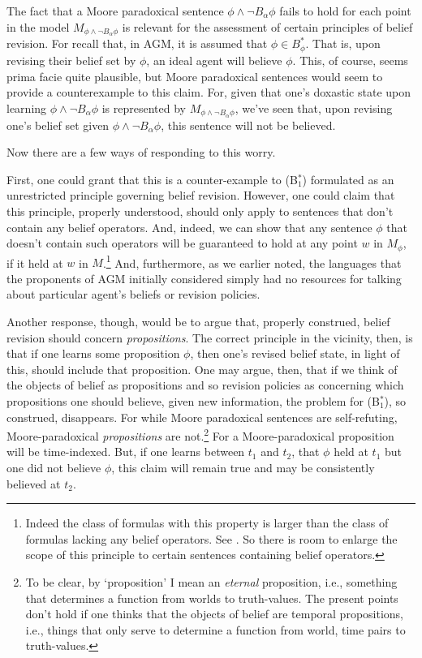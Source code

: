 The fact that a Moore paradoxical sentence $\phi \wedge \lnot B_\alpha \phi$ fails to hold for each point in the model $M_{\phi \wedge \lnot B_\alpha \phi}$ is relevant for the assessment of certain principles of belief revision.
For recall that, in AGM, it is assumed that $\phi \in B^*_\phi$.
That is, upon revising their belief set by $\phi$, an ideal agent will believe $\phi$.
This, of course, seems prima facie quite plausible, but Moore paradoxical sentences would seem to provide a counterexample to this claim.
For, given that one's doxastic state upon learning $\phi \wedge \lnot B_\alpha \phi$ is represented by $M_{\phi \wedge \lnot B_\alpha \phi}$, we've seen that, upon revising one's belief set given $\phi \wedge \lnot B_\alpha \phi$, this sentence will not be believed.


Now there are a few ways of responding to this worry.

First, one could grant that this is a counter-example to (B$^*_1$) formulated as an unrestricted principle governing belief revision.
However, one could claim that this principle, properly understood, should only apply to sentences that don't contain any belief operators.
And, indeed, we can show that any sentence $\phi$ that doesn't contain such operators will be guaranteed to hold at any point $w$ in $M_\phi$, if it held at $w$ in $M$.\footnote{Indeed the class of formulas with this property is larger than the class of formulas lacking any belief operators. See \citet{HollidayIcard1}. So there is room to  enlarge the scope of this principle to certain sentences containing belief operators.}
And, furthermore, as we earlier noted, the languages that the proponents of AGM initially considered simply had no resources for talking about particular agent's beliefs or revision policies.


Another response, though, would be to argue that, properly construed, belief revision should concern \textit{propositions}.
The correct principle in the vicinity, then, is that if one learns some proposition $\phi$, then one's revised belief state, in light of this, should include that proposition.
One may argue, then, that if we think of the objects of belief as propositions and so revision policies as concerning which propositions one should believe, given new information, the problem for (B$^*_1$), so construed, disappears.
For while Moore paradoxical sentences are self-refuting, Moore-paradoxical \textit{propositions} are not.\footnote{To be clear, by `proposition' I mean an \textit{eternal} proposition, i.e., something that determines a function from worlds to truth-values. The present points don't hold if one thinks that the objects of belief are temporal propositions, i.e., things that only serve to determine a function from world, time pairs to truth-values.}
For a Moore-paradoxical proposition will be time-indexed. 
But, if one learns between $t_1$ and $t_2$, that $\phi$ held at $t_1$ but one did not believe $\phi$, this claim will remain true and may be consistently believed at $t_2$.

